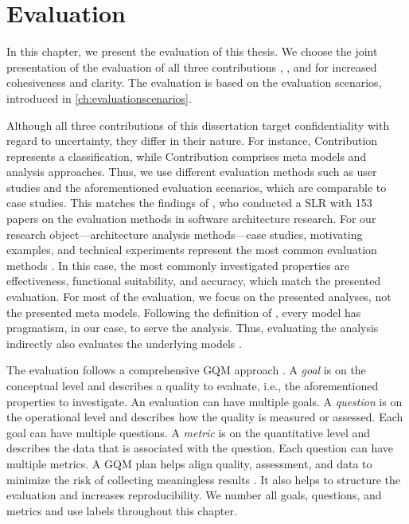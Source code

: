 \chapter{Evaluation}%
\label{ch:evaluation}%


In this chapter, we present the evaluation of this thesis.
We choose the joint presentation of the evaluation of all three contributions , , and  for increased cohesiveness and clarity.
The evaluation is based on the evaluation scenarios, introduced in \autoref{ch:evaluationscenarios}.

Although all three contributions of this dissertation target confidentiality with regard to uncertainty, they differ in their nature.
For instance, Contribution  represents a classification, while Contribution  comprises meta models and analysis approaches.
Thus, we use different evaluation methods such as user studies and the aforementioned evaluation scenarios, which are comparable to case studies.
This matches the findings of \textcite{konersmann_evaluation_2022}, who conducted a \acf{SLR} with 153 papers on the evaluation methods in software architecture research.
For our research object---architecture analysis methods---case studies, motivating examples, and technical experiments represent the most common evaluation methods \cite{konersmann_evaluation_2022}.
In this case, the most commonly investigated properties are effectiveness, functional suitability, and accuracy, which match the presented evaluation.
For most of the evaluation, we focus on the presented analyses, not the presented meta models.
Following the definition of \textcite{stachowiak_allgemeine_1973}, every model has pragmatism, in our case, to serve the analysis.
Thus, evaluating the analysis indirectly also evaluates the underlying models \cite{walter_context-based_2023}.

The evaluation follows a comprehensive \acf{GQM} approach \cite{basili_goal_1994,basili_methodology_1984}.
A \emph{goal} is on the conceptual level and describes a quality to evaluate, i.e., the aforementioned properties to investigate.
An evaluation can have multiple goals.
A \emph{question} is on the operational level and describes how the quality is measured or assessed.
Each goal can have multiple questions.
A \emph{metric} is on the quantitative level and describes the data that is associated with the question.
Each question can have multiple metrics.
A \ac{GQM} plan helps align quality, assessment, and data to minimize the risk of collecting meaningless results \cite{basili_methodology_1984}.
It also helps to structure the evaluation and increases reproducibility.
We number all goals, questions, and metrics and use labels throughout this chapter.

